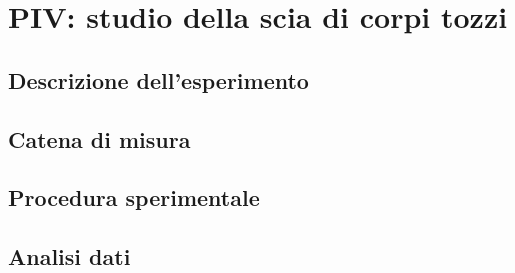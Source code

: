 \section{PIV: studio della scia di corpi tozzi}

\subsection{Descrizione dell'esperimento}

\subsection{Catena di misura}

\subsection{Procedura sperimentale}

\subsection{Analisi dati}